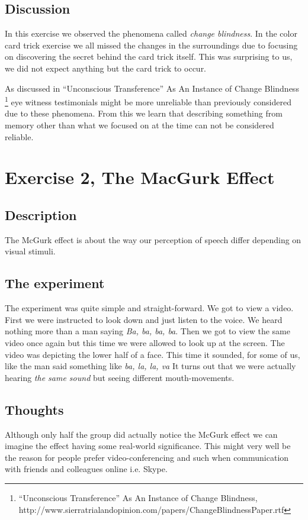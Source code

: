 \documentclass[10pt, a4paper]{article}
\begin{document}
\subsection{Discussion}
In this exercise we observed the phenomena called \emph{change blindness}. In the color card trick exercise we all missed the changes in the surroundings due to focusing on discovering the secret behind the card trick itself. This was surprising to us, we did not expect anything but the card trick to occur. 

As discussed in “Unconscious Transference” As An Instance of Change Blindness \footnote{“Unconscious Transference” As An Instance of Change Blindness, http://www.sierratrialandopinion.com/papers/ChangeBlindnessPaper.rtf} eye witness testimonials might be more unreliable than previously considered due to these phenomena. From this we learn that describing something from memory other than what we focused on at the time can not be considered reliable. 

\section{Exercise 2, The MacGurk Effect}
\subsection{Description}
The McGurk effect is about the way our perception of speech differ depending on visual stimuli.

\subsection{The experiment}
The experiment was quite simple and straight-forward.  We got to view a video. First we were instructed to look down and just listen to the voice.  We heard nothing more than a man saying \emph{Ba, ba, ba, ba}.  Then we got to view the same video once again but this time we were allowed to look up at the screen.  The video was depicting the lower half of a face.  This time it sounded, for some of us,  like the man said something like \emph{ba, la, la, va} It turns out that we were actually hearing \emph{the same sound} but seeing different mouth-movements.

\subsection{Thoughts}
Although only half the group did actually notice the McGurk effect we can imagine the effect having some real-world significance. This might very well be the reason for people prefer video-conferencing and such when communication with friends and colleagues online i.e. Skype.
\end{document}
